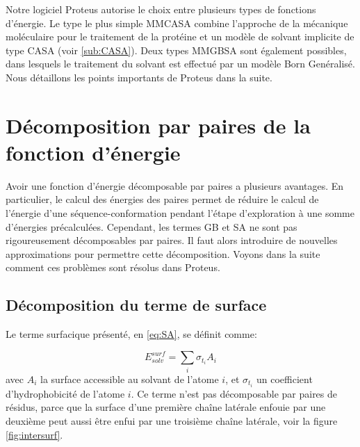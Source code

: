 Notre logiciel Proteus autorise le choix entre plusieurs types de fonctions d'énergie. Le type le plus simple \og MMCASA \fg combine l'approche de la mécanique moléculaire pour le traitement de la protéine et un modèle de solvant implicite de type CASA (voir  \vref{sub:CASA}). Deux types \og MMGBSA \fg sont également possibles, dans lesquels le traitement du solvant est effectué par un modèle Born Genéralisé. Nous détaillons les points importants de Proteus dans la suite.

\section{Décomposition par paires de la fonction d'énergie}
Avoir une fonction d'énergie décomposable par paires a plusieurs avantages. En particulier, le calcul des énergies des paires permet de réduire le calcul de l'énergie d'une séquence-conformation pendant l'étape d'exploration à une somme d'énergies précalculées. Cependant, les termes GB et SA ne sont pas rigoureusement décomposables par paires. Il faut alors introduire de nouvelles approximations pour permettre cette décomposition. Voyons dans la suite comment ces problèmes sont résolus dans Proteus.
\subsection{Décomposition du terme de surface}
\label{sub:surpairwise}

Le terme surfacique présenté, en \vref{eq:SA}, se définit comme:

\begin{equation}
E_{solv}^{surf} = \sum_i \sigma_{t_i} A_i 
\end{equation}
avec $A_i$ la surface accessible au solvant de l'atome $i$, et $\sigma_{t_i}$ un coefficient d'hydrophobicité de l'atome $i$.
Ce terme n'est pas décomposable par paires de résidus, parce que la surface d'une première chaîne latérale enfouie par une deuxième peut aussi être enfui par une troisième chaîne latérale, voir la figure \ref{fig:intersurf}.

